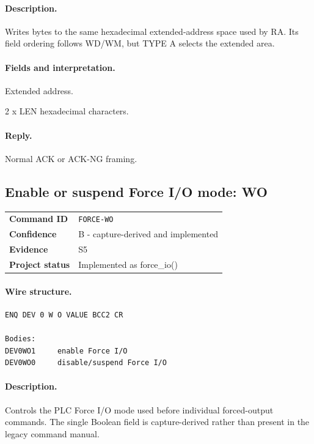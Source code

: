 \documentclass[10pt,letterpaper]{article}
\begin{document}
\paragraph{Description.} Writes bytes to the same hexadecimal extended-address space used by RA. Its field ordering follows WD/WM, but TYPE A selects the extended area.
\paragraph{Fields and interpretation.}
\begin{description}[style=nextline,leftmargin=3.2cm,labelwidth=3.0cm,font=\normalfont\bfseries]
\item[ADDR4\_HEX] Extended address.
\item[DATA\_HEX] 2 x LEN hexadecimal characters.
\end{description}
\paragraph{Reply.} Normal ACK or ACK-NG framing.

\subsection{Enable or suspend Force I/O mode: WO}
\begin{tabularx}{\textwidth}{@{}>{\bfseries}p{2.8cm}X@{}}
Command ID & \texttt{FORCE-WO} \\
Confidence & B - capture-derived and implemented \\
Evidence & S5 \\
Project status & Implemented as force\_io() \\
\end{tabularx}
\vspace{0.35em}
\paragraph{Wire structure.}
\begin{Verbatim}[breaklines=true,breakanywhere=true,fontsize=\small]
ENQ DEV 0 W O VALUE BCC2 CR

Bodies:
DEV0WO1     enable Force I/O
DEV0WO0     disable/suspend Force I/O
\end{Verbatim}
\paragraph{Description.} Controls the PLC Force I/O mode used before individual forced-output commands. The single Boolean field is capture-derived rather than present in the legacy command manual.
\end{document}
